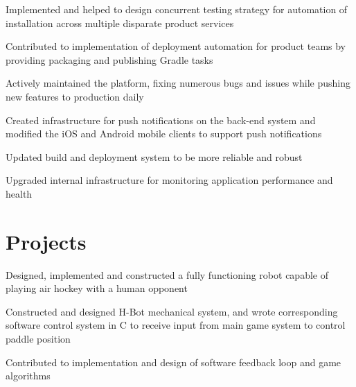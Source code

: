 \documentclass[letterpaper]{deedy-resume} %
\begin{document}
\begin{minipage}[t]{0.66\textwidth}
\begin{tightitemize}
\item Implemented and helped to design concurrent testing strategy for automation of installation across multiple disparate product services
\item Contributed to implementation of deployment automation for product teams by providing packaging and publishing Gradle tasks
\end{tightitemize}

\sectionspace %



\begin{tightitemize}
\item Actively maintained the platform, fixing numerous bugs and issues while pushing new features to production daily
\item Created infrastructure for push notifications on the back-end system and modified the iOS and Android mobile clients to support push notifications
\item Updated build and deployment system to be more reliable and robust
\item Upgraded internal infrastructure for monitoring application performance and health
\end{tightitemize}



\section{Projects}

\begin{tightitemize}
\item Designed, implemented and constructed a fully functioning robot capable of playing air hockey with a human opponent
\item Constructed and designed H-Bot mechanical system, and wrote corresponding software control system in C to receive input from main game system to control paddle position
\item Contributed to implementation and design of software feedback loop and game algorithms
\end{tightitemize}


\end{minipage}
\end{document}
